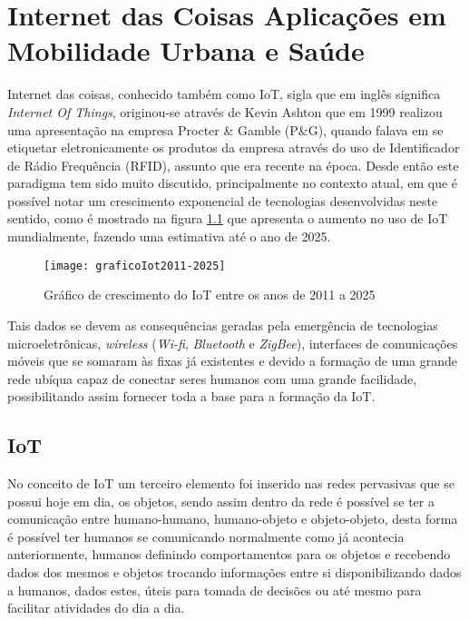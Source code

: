\chapter{Internet das Coisas Aplicações em Mobilidade Urbana e Saúde}
\label{chap:cap1}
Internet das coisas, conhecido também como IoT, sigla que em inglês significa \textit{Internet Of Things}, originou-se através de Kevin Ashton que em 1999 realizou uma apresentação na empresa  Procter \& Gamble (P\&G), quando falava em se etiquetar eletronicamente os produtos da empresa através do uso de Identificador de Rádio Frequência (RFID), assunto que era recente na época. Desde então este paradigma tem sido muito discutido, principalmente no contexto atual, em que é possível notar um crescimento exponencial de tecnologias desenvolvidas neste sentido, como é mostrado na figura \ref{fig:graficoIot2011-2025} que apresenta o aumento no uso de IoT mundialmente, fazendo uma estimativa até o ano de 2025.\cite{historiaiot} 

\begin{figure}[htb]
\caption{\label{fig:graficoIot2011-2025}Gráfico de crescimento do IoT entre os anos de 2011 a 2025}
\begin{center}
\texttt{[image: graficoIot2011-2025]}
\end{center}
\end{figure}

Tais dados se devem as consequências geradas pela emergência de tecnologias microeletrônicas, \textit{wireless} (\textit{Wi-fi}, \textit{Bluetooth} e \textit{ZigBee}), interfaces de comunicações móveis que se somaram às fixas já existentes e devido a formação de uma grande rede ubíqua capaz de conectar seres humanos com uma grande facilidade, possibilitando assim fornecer toda a base para a formação da IoT. \cite{santaella2013} 

\section{IoT}
\label{sec:iot}
No conceito de IoT um terceiro elemento foi inserido nas redes pervasivas que se possui hoje em dia, os objetos, sendo assim dentro da rede é possível se ter a comunicação entre humano-humano, humano-objeto e objeto-objeto, desta forma é possível ter humanos se comunicando normalmente como já acontecia anteriormente, humanos definindo comportamentos para os objetos e recebendo dados dos mesmos e objetos trocando informações entre si disponibilizando dados a humanos, dados estes, úteis para tomada de decisões ou até mesmo para facilitar atividades do dia a dia.\cite{santaella2013}

